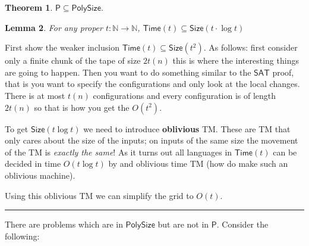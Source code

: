 \documentclass[twoside]{article}
\newcounter{lecnum}
\newtheorem{theorem}{Theorem}[lecnum]
\newtheorem{lemma}[theorem]{Lemma}
\newenvironment{proof}{{\bf Proof:}}{\hfill\rule{2mm}{2mm}}
\def\N{\mathbb{N}}
\def\P{\mathsf{P}}
\begin{document}
\begin{theorem}
$\P \subseteq \mathsf{PolySize}$.
\end{theorem}
\begin{lemma}
For any proper $t: \N \rightarrow \N$, $\mathsf{Time}(t) \subseteq \mathsf{Size}(t\cdot \log t)$
\end{lemma}
\begin{proof}
First show the weaker inclusion $\mathsf{Time}(t) \subseteq \mathsf{Size}(t^2)$. As follows: first consider only a finite chunk of the tape of size $2t(n)$ this is where the interesting things are going to happen. Then you want to do something similar to the $\mathsf{SAT}$ proof, that is you want to specify the configurations and only look at the local changes. There is at most $t(n)$ configurations and every configuration is of length $2t(n)$ so that is how you get the $O(t^2)$. 

To get $\mathsf{Size}(t\log t)$ we need to introduce \textbf{oblivious} TM. These are TM that only cares about the size of the inputs; on inputs of the same size the movement of the TM is \emph{exactly the same}! As it turns out all languages in $\mathsf{Time}(t)$ can be decided in time $O(t \log t)$ by and oblivious time TM (how do make such an oblivious machine).

Using this oblivious TM we can simplify the grid to $O(t)$. 
\end{proof}

There are problems which are in $\mathsf{PolySize}$ but are not in $\P$. Consider the following: 
\end{document}

